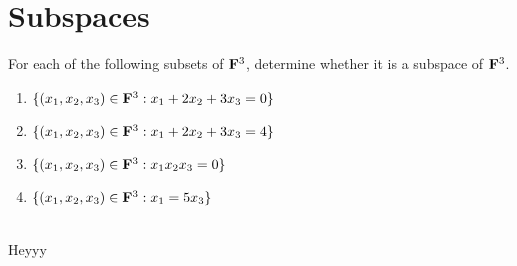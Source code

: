 \section{Subspaces}

\begin{exercise}
    For each of the following subsets of $\mathbf{F}^3$, determine whether it is a subspace of $\mathbf{F}^3$.
    \begin{enumerate}[label=(\alph*)]
        \item $\{(x_1,x_2,x_3)\in \mathbf{F}^3 : x_1 + 2x_2 + 3x_3  = 0\}$
        \item $\{(x_1,x_2,x_3)\in \mathbf{F}^3 : x_1 + 2x_2 + 3x_3  = 4\}$
        \item $\{(x_1,x_2,x_3)\in \mathbf{F}^3 : x_1 x_2 x_3  = 0\}$
        \item $\{(x_1,x_2,x_3)\in \mathbf{F}^3 : x_1 = 5x_3\}$\\
    \end{enumerate}
\end{exercise}

\begin{solution}
    \\ Heyyy 
\end{solution}